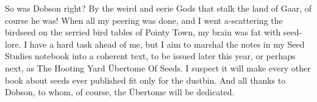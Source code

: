So was Dobson right? By the weird and eerie Gods that stalk the land of Gaar, of course he was! When all my peering was done, and I went a-scattering the birdseed on the serried bird tables of Pointy Town, my brain was fat with seed-lore. I have a hard task ahead of me, but I aim to marshal the notes in my Seed Studies notebook into a coherent text, to be issued later this year, or perhaps next, as The Hooting Yard \"Ubertome Of Seeds. I suspect it will make every other book about seeds ever published fit only for the dustbin. And all thanks to Dobson, to whom, of course, the \"Ubertome will be dedicated.